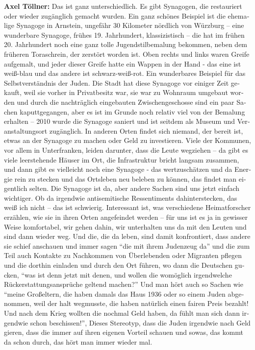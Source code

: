 \begin{otherlanguage}{ngerman}
\textbf{Axel Töllner:} Das ist ganz unterschiedlich. Es gibt Synagogen, die restauriert oder wieder zugänglich gemacht wurden. Ein ganz schönes Beispiel ist die ehemalige Synagoge in Arnstein, ungefähr 30 Kilometer nördlich von Würzburg – eine wunderbare Synagoge, frühes 19. Jahrhundert, klassizistisch – die hat im frühen 20. Jahrhundert noch eine ganz tolle Jugendstilbemalung bekommen, neben dem früheren Toraschrein, der zerstört worden ist. Oben rechts und links waren Greife aufgemalt, und jeder dieser Greife hatte ein Wappen in der Hand - das eine ist weiß-blau und das andere ist schwarz-weiß-rot. Ein wunderbares Beispiel für das Selbstverständnis der Juden. 
Die Stadt hat diese Synagoge vor einiger Zeit gekauft, weil sie vorher in Privatbesitz war, sie war zu Wohnraum umgebaut worden und durch die nachträglich eingebauten Zwischengeschosse sind ein paar Sachen kaputtgegangen, aber es ist im Grunde noch relativ viel von der Bemalung erhalten – 2010 wurde die Synagoge saniert und ist seitdem als Museum und Veranstaltungsort zugänglich.  
In anderen Orten findet sich niemand, der bereit ist, etwas an der Synagoge zu machen oder Geld zu investieren. Viele der Kommunen, vor allem in Unterfranken, leiden darunter, dass die Leute wegziehen – da gibt es viele leerstehende Häuser im Ort, die Infrastruktur bricht langsam zusammen, und dann gibt es vielleicht noch eine Synagoge - das wertzuschätzen und da Energie rein zu stecken und das Ortsleben neu beleben zu können, das findet man eigentlich selten. Die Synagoge ist da, aber andere Sachen sind uns jetzt einfach wichtiger. Ob da irgendwie antisemitische Ressentiments dahinterstecken, das weiß ich nicht – das ist schwierig. 
Interessant ist, was verschiedene Heimatforscher erzählen, wie sie in ihren Orten angefeindet werden – für uns ist es ja in gewisser Weise komfortabel, wir gehen dahin, wir unterhalten uns da mit den Leuten und sind dann wieder weg. Und die, die da leben, sind damit konfrontiert, dass andere sie schief anschauen und immer sagen "`die mit ihrem Judenzeug da"' und die zum Teil auch Kontakte zu Nachkommen von Überlebenden oder Migranten pflegen und die dorthin einladen und durch den Ort führen, wo dann die Deutschen gucken, "`was ist denn jetzt mit denen, und wollen die womöglich irgendwelche Rückerstattungsansprüche geltend machen?"' 
Und man hört auch so Sachen wie "`meine Großeltern, die haben damals das Haus 1936 oder so einem Juden abgenommen, weil der halt wegmusste, die haben natürlich einen fairen Preis bezahlt! Und nach dem Krieg wollten die nochmal Geld haben, da fühlt man sich dann irgendwie schon beschissen!"', Dieses Stereotyp, dass die Juden irgendwie nach Geld gieren, dass die immer auf ihren eigenen Vorteil schauen und sowas, das kommt da schon durch, das hört man immer wieder mal.  

\end{otherlanguage}
